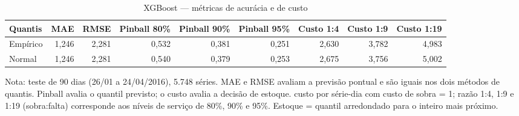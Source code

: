 \begin{table}[htbp]
\centering
\small
\caption{XGBoost — métricas de acurácia e de custo}
\label{tab:xgb_metricas}
\begin{tabular}{lrrrrrrrr}
\toprule
Quantis & MAE & RMSE & Pinball 80\% & Pinball 90\% & Pinball 95\% & Custo 1:4 & Custo 1:9 & Custo 1:19 \\
\midrule
Empírico & 1,246 & 2,281 & 0,532 & 0,381 & 0,251 & 2,630 & 3,782 & 4,983 \\
Normal & 1,246 & 2,281 & 0,540 & 0,379 & 0,253 & 2,675 & 3,756 & 5,002 \\
\bottomrule
\end{tabular}
\par\smallskip
{\footnotesize Nota: teste de 90 dias (26/01 a 24/04/2016), 5.748 séries. MAE e RMSE avaliam a previsão pontual e são iguais nos dois métodos de quantis. Pinball avalia o quantil previsto; o custo avalia a decisão de estoque. custo por série-dia com custo de sobra = 1; razão 1:4, 1:9 e 1:19 (sobra:falta) corresponde aos níveis de serviço de 80\%, 90\% e 95\%. Estoque = quantil arredondado para o inteiro mais próximo.}
\end{table}
